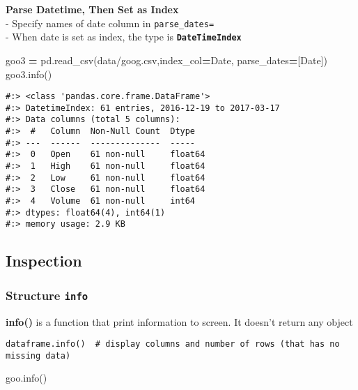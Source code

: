 \documentclass[
]{book}
\newenvironment{Shaded}{\begin{snugshade}}{\end{snugshade}}
\newcommand{\NormalTok}[1]{#1}
\newcommand{\OperatorTok}[1]{\textcolor[rgb]{0.43,0.43,0.43}{\textbf{#1}}}
\newcommand{\StringTok}[1]{\textcolor[rgb]{0.5,0.5,0.5}{#1}}
\begin{document}
\textbf{Parse Datetime, Then Set as Index}\\
- Specify names of date column in \texttt{parse\_dates=}\\
- When date is set as index, the type is \textbf{\texttt{DateTimeIndex}}

\begin{Shaded}
\begin{Highlighting}[]
\NormalTok{goo3 }\OperatorTok{=}\NormalTok{ pd.read\_csv(}\StringTok{\textquotesingle{}data/goog.csv\textquotesingle{}}\NormalTok{,index\_col}\OperatorTok{=}\StringTok{\textquotesingle{}Date\textquotesingle{}}\NormalTok{, parse\_dates}\OperatorTok{=}\NormalTok{[}\StringTok{\textquotesingle{}Date\textquotesingle{}}\NormalTok{])}
\NormalTok{goo3.info()}
\end{Highlighting}
\end{Shaded}

\begin{verbatim}
#:> <class 'pandas.core.frame.DataFrame'>
#:> DatetimeIndex: 61 entries, 2016-12-19 to 2017-03-17
#:> Data columns (total 5 columns):
#:>  #   Column  Non-Null Count  Dtype  
#:> ---  ------  --------------  -----  
#:>  0   Open    61 non-null     float64
#:>  1   High    61 non-null     float64
#:>  2   Low     61 non-null     float64
#:>  3   Close   61 non-null     float64
#:>  4   Volume  61 non-null     int64  
#:> dtypes: float64(4), int64(1)
#:> memory usage: 2.9 KB
\end{verbatim}

\hypertarget{inspection}{%
\subsection{Inspection}\label{inspection}}

\hypertarget{structure-info}{%
\subsubsection{\texorpdfstring{Structure \texttt{info}}{Structure info}}\label{structure-info}}

\textbf{info()} is a function that print information to screen. It doesn't return any object

\begin{verbatim}
dataframe.info()  # display columns and number of rows (that has no missing data)
\end{verbatim}

\begin{Shaded}
\begin{Highlighting}[]
\NormalTok{goo.info()}
\end{Highlighting}
\end{Shaded}
\end{document}
